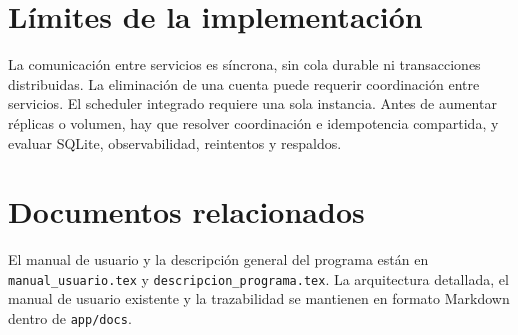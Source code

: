 \documentclass[12pt,a4paper]{article}
\begin{document}
\section{Límites de la implementación}
La comunicación entre servicios es síncrona, sin cola durable ni transacciones distribuidas. La eliminación de una cuenta puede requerir coordinación entre servicios. El scheduler integrado requiere una sola instancia. Antes de aumentar réplicas o volumen, hay que resolver coordinación e idempotencia compartida, y evaluar SQLite, observabilidad, reintentos y respaldos.

\section{Documentos relacionados}
El manual de usuario y la descripción general del programa están en \texttt{manual\_usuario.tex} y \texttt{descripcion\_programa.tex}. La arquitectura detallada, el manual de usuario existente y la trazabilidad se mantienen en formato Markdown dentro de \texttt{app/docs}.
\end{document}

